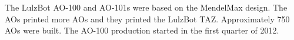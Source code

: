 %
%
%
%
%


The LulzBot AO-100 and AO-101s were based on the MendelMax design. The AOs
printed more AOs and they printed the LulzBot TAZ. Approximately
750 AOs were built. The AO-100 production started in the first
quarter of 2012.




